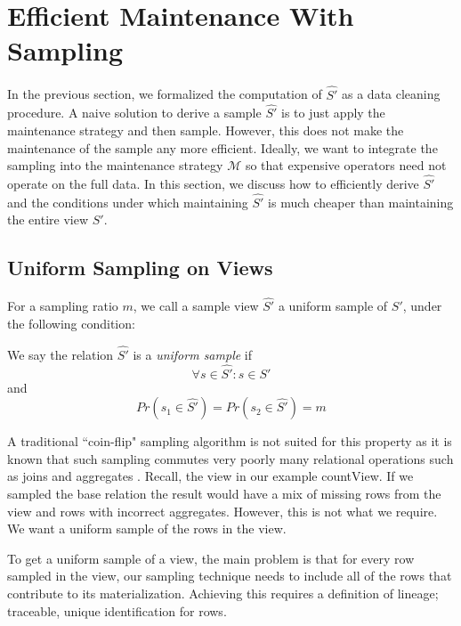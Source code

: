 \section{Efficient Maintenance With Sampling} \label{sampling}
In the previous section, we formalized the computation of $\hat{S'}$  as a data cleaning procedure.
A naive solution to derive a sample $\hat{S'}$ is to just apply the maintenance strategy and then sample.
However, this does not make the maintenance of the sample any more efficient.
Ideally, we want to integrate the sampling into the maintenance strategy $\mathcal{M}$ so that expensive operators
need not operate on the full data.
In this section, we discuss how to efficiently derive $\hat{S'}$ and the conditions under which
maintaining $\hat{S'}$ is much cheaper than maintaining the entire view $S'$.

\subsection{Uniform Sampling on Views}
For a sampling ratio $m$, we call a sample view $\hat{S'}$ a uniform sample of $S'$, under the following condition:
\begin{definition} We say the relation $\hat{S'}$ is a \emph{uniform sample} if
\[ \forall s \in \hat{S'} : s \in S' \]
and
\[Pr(s_1 \in \hat{S'}) =  Pr(s_2 \in \hat{S'}) = m \]
\end{definition}
A traditional ``coin-flip" sampling algorithm is not suited for this property as it is known that such sampling commutes very poorly many relational operations such as joins and aggregates \cite{chaudhuri1999random}.
Recall, the view in our example \textsf{countView}. 
If we sampled the base relation the result would have a mix of missing rows from the view and rows with incorrect aggregates.
However, this is not what we require.
We want a uniform sample of the rows in the view. 

To get a uniform sample of a view, the main problem is that for every row sampled in the view, our sampling technique needs to include all of the rows that contribute to its materialization.
Achieving this requires a definition of lineage; traceable, unique identification for rows.

